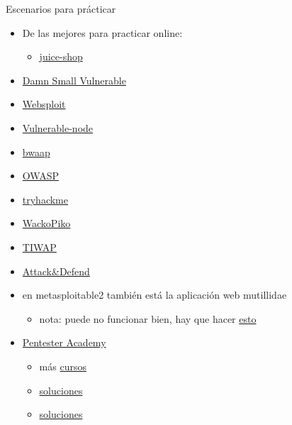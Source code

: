 \documentclass[aspectratio=169,10pt]{beamer}
\begin{document}
\begin{frame}[allowframebreaks]{Escenarios para prácticar}
\small
  \begin{itemize}
  \item De las mejores para practicar online:
    \begin{itemize}
    \item \href{https://juice-shop.herokuapp.com/\#/score-board}{juice-shop}
    \end{itemize}
  \item \href{https://blog.appsecco.com/damn-small-vulnerable-web-in-docker-fd850ee129d5}{Damn Small Vulnerable}
  \item \href{https://websploit.org/}{Websploit}
  \item \href{https://github.com/cr0hn/vulnerable-node?s=03}{Vulnerable-node}
  \item \href{http://www.itsecgames.com/}{bwaap}
  \item \href{https://sourceforge.net/projects/owaspbwa/}{OWASP}
  \item \href{https://tryhackme.com/room/owasptop10}{tryhackme}
  \item \href{https://github.com/adamdoupe/WackoPicko}{WackoPiko}
  \item \href{https://www.kitploit.com/2021/11/tiwap-totally-insecure-web-application.html}{TIWAP}
  \item \href{https://attackdefense.com/search?search=injection}{Attack\&Defend}
  \item en metasploitable2 también está la aplicación web mutillidae
    \begin{itemize}
    \item nota: puede no funcionar bien, hay que hacer \href{https://www.youtube.com/watch?v=JJmMVzId5jU}{esto}
    \end{itemize}
  \item \href{https://www.pentesteracademy.com/onlinelabs}{Pentester Academy}
    \begin{itemize}
    \item más \href{https://www.pentesteracademy.com/topics}{cursos}
    \item \href{https://blog.pentesteracademy.com/api6-2019-mass-assignment-ii-e23423384141}{soluciones}
    \item \href{https://blog.pentesteracademy.com/api5-2019-broken-function-level-auth-ii-46e8728dc705}{soluciones}
    \end{itemize}
  \end{itemize}
\end{frame}
\end{document}
